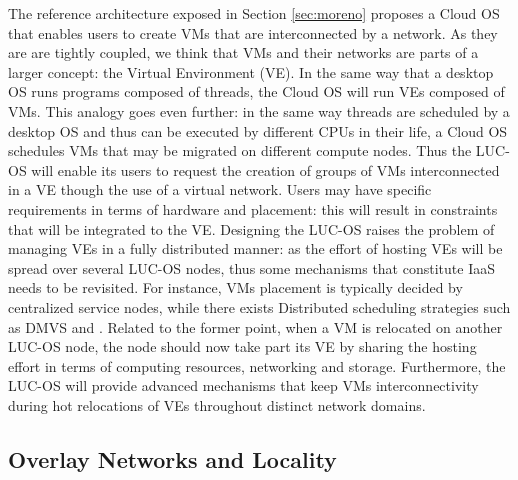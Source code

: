 The reference architecture exposed in Section \ref{sec:moreno} proposes a Cloud 
OS that enables users to create VMs that are interconnected by a network. As 
they are are tightly coupled, we think that VMs and their networks are parts
of a larger concept: the Virtual Environment (VE). In the same way that a 
desktop OS runs programs composed of threads, the Cloud OS will run VEs composed
of VMs. This analogy goes even further: in the same way threads are scheduled by
a desktop OS and thus can be executed by different CPUs in their life, a Cloud 
OS schedules VMs that may be migrated on different compute nodes. Thus the 
LUC-OS will enable its users to request the creation of groups of VMs 
interconnected in a VE though the use of a virtual network. Users may have 
specific requirements in terms of hardware and placement: this will result in 
constraints that will be integrated to the VE. Designing the LUC-OS raises the 
problem of managing VEs in a fully distributed manner: as the effort of hosting 
VEs will be spread over several LUC-OS nodes, thus some mechanisms that 
constitute IaaS needs to be revisited. For instance, VMs placement is typically 
decided by centralized service nodes, while there exists Distributed scheduling 
strategies such as DMVS \cite{quesnel:ispa2013} and 
\cite{DBLP:conf/cloudcom/FellerME12}. Related to the former point, when a VM is 
relocated on another LUC-OS node, the node should now take part its VE by 
sharing the hosting effort in terms of computing resources, networking and 
storage. Furthermore, the LUC-OS will provide advanced mechanisms that keep VMs
interconnectivity during hot relocations of VEs throughout distinct network 
domains.


\subsection{Overlay Networks and Locality}
\label{sec:lbo}

